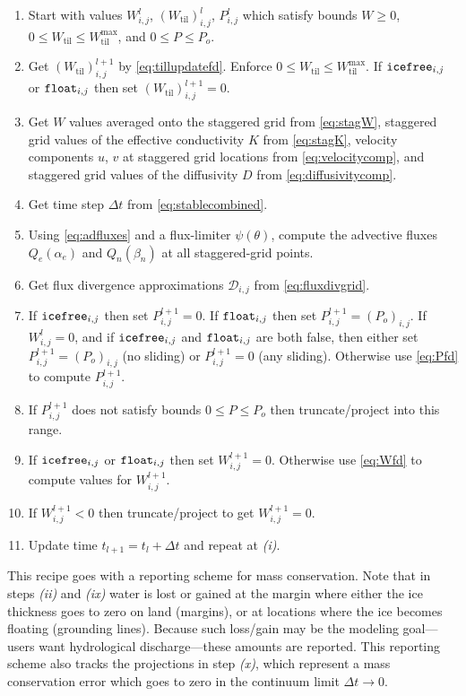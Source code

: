 \documentclass[gmd]{copernicus}   %
\begin{document}
\renewcommand{\labelenumi}{\emph{(\roman{enumi})}}
\begin{enumerate}
\item Start with values $W^l_{i,j}$, $(W_{\text{til}})_{i,j}^l$, $P_{i,j}^l$ which satisfy bounds $W\ge 0$, $0\le W_{\text{til}} \le W_{\text{til}}^{\text{max}}$, and $0 \le P \le P_o$.
\item Get $(W_{\text{til}})_{i,j}^{l+1}$ by \eqref{eq:tillupdatefd}.  Enforce $0\le W_{\text{til}} \le W_{\text{til}}^{\text{max}}$.  If $\text{\texttt{icefree}}_{i,j}$ or $\text{\texttt{float}}_{i,j}$ then set $(W_{\text{til}})_{i,j}^{l+1}=0$.
\item Get $W$ values averaged onto the staggered grid from \eqref{eq:stagW}, staggered grid values of the effective conductivity $K$ from \eqref{eq:stagK}, velocity components $u$, $v$ at staggered grid locations from \eqref{eq:velocitycomp}, and staggered grid values of the diffusivity $D$ from \eqref{eq:diffusivitycomp}.
\item Get time step $\Delta t$ from \eqref{eq:stablecombined}.
\item Using \eqref{eq:adfluxes} and a flux-limiter $\psi(\theta)$, compute the advective fluxes $Q_e(\alpha_e)$ and $Q_n(\beta_n)$ at all staggered-grid points.
\item Get flux divergence approximations $\mathcal{D}_{i,j}$ from \eqref{eq:fluxdivgrid}.
\item If $\text{\texttt{icefree}}_{i,j}$ then set $P_{i,j}^{l+1}=0$.  If $\text{\texttt{float}}_{i,j}$ then set $P_{i,j}^{l+1} = (P_o)_{i,j}$.  If $W^l_{i,j}=0$, and if $\text{\texttt{icefree}}_{i,j}$ and $\text{\texttt{float}}_{i,j}$ are both false, then either set $P_{i,j}^{l+1} = (P_o)_{i,j}$ (no sliding) or $P_{i,j}^{l+1} = 0$ (any sliding).  Otherwise use \eqref{eq:Pfd} to compute $P_{i,j}^{l+1}$.
\item If $P_{i,j}^{l+1}$ does not satisfy bounds $0 \le P \le P_o$ then truncate/project into this range.
\item If $\text{\texttt{icefree}}_{i,j}$ or $\text{\texttt{float}}_{i,j}$ then set $W_{i,j}^{l+1}=0$.  Otherwise use \eqref{eq:Wfd} to compute values for $W_{i,j}^{l+1}$.
\item If $W_{i,j}^{l+1}<0$ then truncate/project to get $W_{i,j}^{l+1}=0$.
\item Update time $t_{l+1}=t_l+\Delta t$ and repeat at \emph{(i)}.
\end{enumerate}

\medskip
This recipe goes with a reporting scheme for mass conservation.  Note that in steps \emph{(ii)} and \emph{(ix)} water is lost or gained at the margin where either the ice thickness goes to zero on land (margins), or at locations where the ice becomes floating (grounding lines).  Because such loss/gain may be the modeling goal---users want hydrological discharge---these amounts are reported.  This reporting scheme also tracks the projections in step \emph{(x)}, which represent a mass conservation error which goes to zero in the continuum limit $\Delta t\to 0$.
\end{document}
